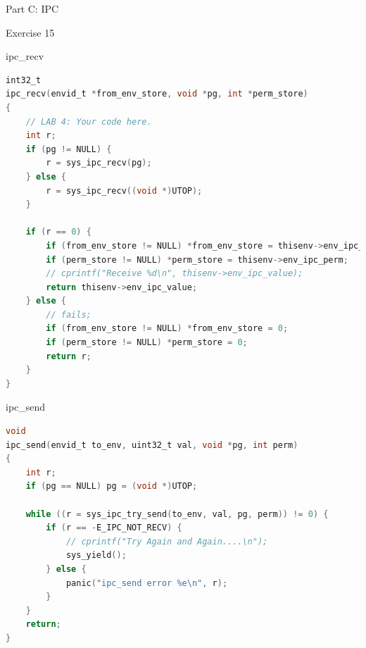 \documentclass[GBK,winfonts,a4paper,10pt]{ctexart}
\begin{document}
\begin{section}{ Part C: IPC }
\begin{subsection}{ Exercise 15 }
\begin{subsection}{ ipc\_recv }
\begin{lstlisting}[language = C]
int32_t
ipc_recv(envid_t *from_env_store, void *pg, int *perm_store)
{
	// LAB 4: Your code here.
	int r;
	if (pg != NULL) {
		r = sys_ipc_recv(pg);
	} else {
		r = sys_ipc_recv((void *)UTOP);
	}

	if (r == 0) {
		if (from_env_store != NULL) *from_env_store = thisenv->env_ipc_from;
		if (perm_store != NULL) *perm_store = thisenv->env_ipc_perm;
		// cprintf("Receive %d\n", thisenv->env_ipc_value);
		return thisenv->env_ipc_value;
	} else {
		// fails;
		if (from_env_store != NULL) *from_env_store = 0;
		if (perm_store != NULL) *perm_store = 0;
		return r;
	}
}
\end{lstlisting}
\end{subsection}

\begin{subsection}{ ipc\_send }
\begin{lstlisting}[language = C]
void
ipc_send(envid_t to_env, uint32_t val, void *pg, int perm)
{
	int r;
	if (pg == NULL) pg = (void *)UTOP;
	
	while ((r = sys_ipc_try_send(to_env, val, pg, perm)) != 0) {
		if (r == -E_IPC_NOT_RECV) {
			// cprintf("Try Again and Again....\n");
			sys_yield();
		} else {
			panic("ipc_send error %e\n", r);
		}
	}
	return;
}
\end{lstlisting}
\end{subsection}

\end{subsection}

\end{section}
\end{document}
